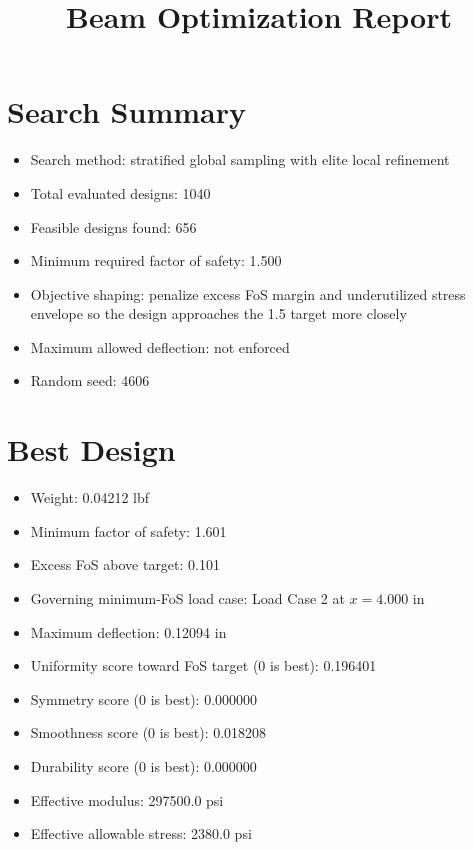 \documentclass[11pt]{article}
\title{Beam Optimization Report}
\date{}
\begin{document}
\maketitle

\section*{Search Summary}
\begin{itemize}
\item Search method: stratified global sampling with elite local refinement
\item Total evaluated designs: 1040
\item Feasible designs found: 656
\item Minimum required factor of safety: 1.500
\item Objective shaping: penalize excess FoS margin and underutilized stress envelope so the design approaches the 1.5 target more closely
\item Maximum allowed deflection: not enforced
\item Random seed: 4606
\end{itemize}

\section*{Best Design}
\begin{itemize}
\item Weight: 0.04212 lbf
\item Minimum factor of safety: 1.601
\item Excess FoS above target: 0.101
\item Governing minimum-FoS load case: Load Case 2 at $x=4.000$ in
\item Maximum deflection: 0.12094 in
\item Uniformity score toward FoS target (0 is best): 0.196401
\item Symmetry score (0 is best): 0.000000
\item Smoothness score (0 is best): 0.018208
\item Durability score (0 is best): 0.000000
\item Effective modulus: 297500.0 psi
\item Effective allowable stress: 2380.0 psi
\end{itemize}
\end{document}
